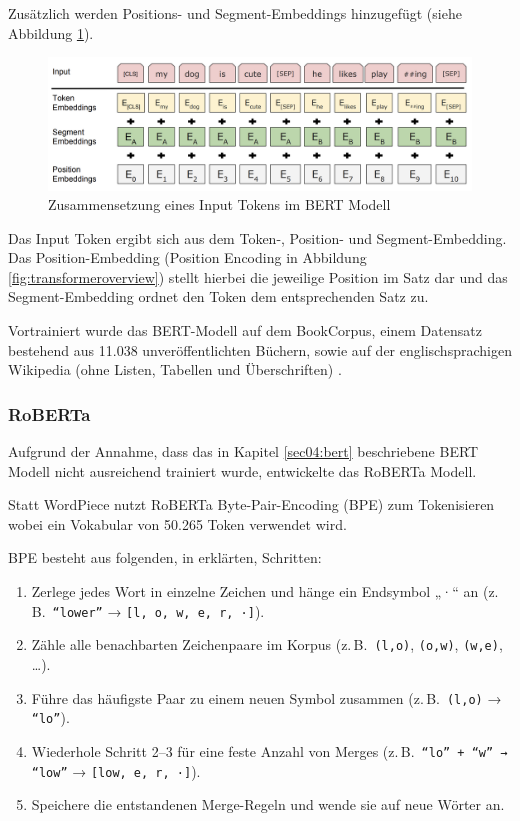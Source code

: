 Zusätzlich werden Positions- und Segment-Embeddings hinzugefügt (siehe Abbildung \ref{fig:bert_tokenizierung}).

\begin{figure}[htbp]
    \begin{center}
        \includegraphics[width=\linewidth]{static/bert_tokenizierung.png}
        \caption{\label{fig:bert_tokenizierung} Zusammensetzung eines Input Tokens im BERT Modell \cite{devlin2019}}
    \end{center}
\end{figure}

Das Input Token ergibt sich aus dem Token-, Position- und Segment-Embedding. Das Position-Embedding (Position Encoding in Abbildung \ref{fig:transformeroverview}) 
stellt hierbei die jeweilige Position im Satz dar und das Segment-Embedding ordnet den Token dem entsprechenden Satz zu.

Vortrainiert wurde das BERT-Modell auf dem BookCorpus, einem Datensatz bestehend aus 11.038 unveröffentlichten Büchern, sowie auf der englischsprachigen Wikipedia 
(ohne Listen, Tabellen und Überschriften) \cite{DBLP:journals/corr/abs-1810-04805}.

\subsubsection{RoBERTa} \label{sec04:roberta}

Aufgrund der Annahme, dass das in Kapitel \ref{sec04:bert} beschriebene BERT Modell nicht ausreichend trainiert wurde, entwickelte 
\cite{DBLP:journals/corr/abs-1907-11692} das RoBERTa Modell.

Statt WordPiece nutzt RoBERTa Byte-Pair-Encoding (BPE) zum Tokenisieren wobei ein Vokabular von 50.265 Token verwendet wird.

BPE besteht aus folgenden, in \cite{sennrich2015} erklärten, Schritten:
\begin{enumerate}
  \item Zerlege jedes Wort in einzelne Zeichen und hänge ein Endsymbol „·“ an (z.\,B.\ \texttt{``lower''} → \texttt{[l, o, w, e, r, ·]}).
  \item Zähle alle benachbarten Zeichenpaare im Korpus (z.\,B.\ \texttt{(l,o)}, \texttt{(o,w)}, \texttt{(w,e)}, \dots).
  \item Führe das häufigste Paar zu einem neuen Symbol zusammen (z.\,B.\ \texttt{(l,o)} → \texttt{``lo''}).
  \item Wiederhole Schritt 2–3 für eine feste Anzahl von Merges (z.\,B.\ \texttt{``lo'' + ``w'' → ``low''} → \texttt{[low, e, r, ·]}).
  \item Speichere die entstandenen Merge-Regeln und wende sie auf neue Wörter an.
\end{enumerate}

